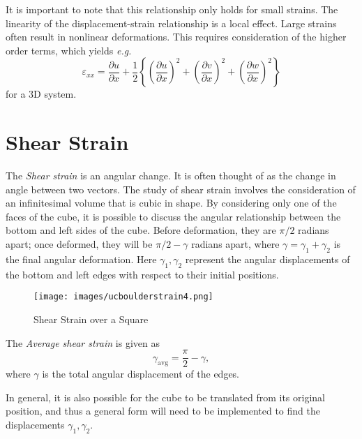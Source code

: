 It is important to note that this relationship only holds for small strains. The linearity of the displacement-strain relationship is a local effect. Large strains often result in nonlinear deformations. This requires consideration of the higher order terms, which yields \emph{e.g.}
\begin{equation}
\varepsilon_{xx} = \frac{\partial u}{\partial x}+\frac{1}{2}\left\lbrace \left(\frac{\partial u}{\partial x}\right)^2+\left(\frac{\partial v}{\partial x}\right)^2 +\left(\frac{\partial w}{\partial x}\right)^2\right\rbrace
\end{equation}
for a 3D system.

\section{Shear Strain}
The \emph{Shear strain} is an angular change. It is often thought of as the change in angle between two vectors. The study of shear strain involves the consideration of an infinitesimal volume that is cubic in shape. By considering only one of the faces of the cube, it is possible to discuss the angular relationship between the bottom and left sides of the cube. Before deformation, they are $\pi/2$ radians apart; once deformed, they will be $\pi/2-\gamma$ radians apart, where $\gamma = \gamma_1+\gamma_2$ is the final angular deformation. Here $\gamma_1,\gamma_2$ represent the angular displacements of the bottom and left edges with respect to their initial positions. 
\begin{figure}[ht!]
\caption{Shear Strain over a Square \cite{boulderstrain4}}
\centering
\texttt{[image: images/ucboulderstrain4.png]}
\label{im:strain.boulder}
\end{figure}

The \emph{Average shear strain} is given as
\begin{equation}
\gamma_{\text{avg}} = \frac{\pi}{2}-\gamma,
\end{equation}
where $\gamma$ is the total angular displacement of the edges.

In general, it is also possible for the cube to be translated from its original position, and thus a general form will need to be implemented to find the displacements $\gamma_1,\gamma_2$.

